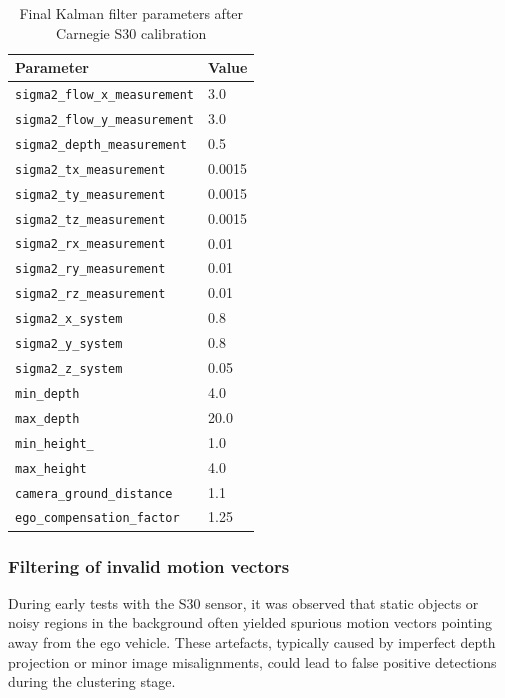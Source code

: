 \begin{table}[H]
  \centering
  \begin{tabular}{l l}
    \toprule
    \textbf{Parameter} & \textbf{Value} \\
    \midrule
    \texttt{sigma2\_flow\_x\_measurement} & 3.0 \\
    \texttt{sigma2\_flow\_y\_measurement} & 3.0 \\
    \texttt{sigma2\_depth\_measurement}  & 0.5 \\
    \texttt{sigma2\_tx\_measurement}     & 0.0015 \\
    \texttt{sigma2\_ty\_measurement}     & 0.0015 \\
    \texttt{sigma2\_tz\_measurement}     & 0.0015 \\
    \texttt{sigma2\_rx\_measurement}     & 0.01 \\
    \texttt{sigma2\_ry\_measurement}     & 0.01 \\
    \texttt{sigma2\_rz\_measurement}     & 0.01 \\
    \texttt{sigma2\_x\_system}           & 0.8 \\
    \texttt{sigma2\_y\_system}           & 0.8 \\
    \texttt{sigma2\_z\_system}           & 0.05 \\
    \texttt{min\_depth}                 & 4.0 \\
    \texttt{max\_depth}                 & 20.0 \\
    \texttt{min\_height\_}              & 1.0 \\
    \texttt{max\_height}                & 4.0 \\
    \texttt{camera\_ground\_distance}   & 1.1 \\
    \texttt{ego\_compensation\_factor}  & 1.25 \\
    \bottomrule
  \end{tabular}
  \caption{Final Kalman filter parameters after Carnegie S30 calibration}
  \label{tab:carnegie_kalman_params}
\end{table}

\subsubsection{Filtering of invalid motion vectors}

During early tests with the S30 sensor, it was observed that static objects 
or noisy regions in the background often yielded spurious motion vectors 
pointing away from the ego vehicle. These artefacts, typically caused by 
imperfect depth projection or minor image misalignments, could lead to 
false positive detections during the clustering stage.

